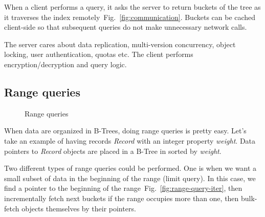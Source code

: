 \documentclass[notitlepage]{revtex4-1}
\newcommand{\figref}[1]{Fig.~\ref{#1}}
\begin{document}
When a client performs a query, it asks the server to return buckets of the tree as it traverses the index remotely~\figref{fig:communication}.
Buckets can be cached client-side so that subsequent queries do not make unnecessary network calls.

The server cares about data replication, multi-version concurrency, object locking, user authentication, quotas etc.
The client performs encryption/decryption and query logic.

\subsection{Range queries}

\begin{figure}
	\begin{center}
        \qquad
	\end{center}
	\caption{Range queries}
	\label{fig:range-query}
\end{figure}

When data are organized in B-Trees, doing range queries is pretty easy.
Let's take an example of having records \emph{Record} with an integer property \emph{weight}.
Data pointers to \emph{Record} objects are placed in a B-Tree in sorted by \emph{weight}.

Two different types of range queries could be performed.
One is when we want a small subset of data in the beginning of the range (limit query).
In this case, we find a pointer to the beginning of the range~\figref{fig:range-query-iter}, then incrementally fetch next buckets if the range occupies more than one, then bulk-fetch objects themselves by their pointers.
\end{document}
